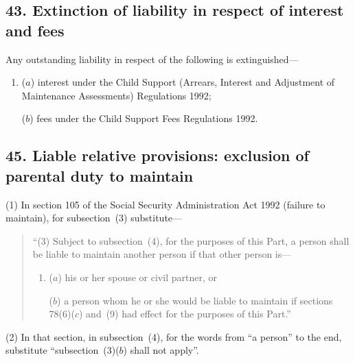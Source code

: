 \documentclass[12pt,a4paper]{article}
\begin{document}
\subsection{43. Extinction of liability in respect of interest and fees}

Any outstanding liability in respect of the following is extinguished—
\begin{enumerate}\item[]
($a$) interest under the Child Support (Arrears, Interest and Adjustment of Maintenance Assessments) Regulations 1992;

($b$) fees under the Child Support Fees Regulations 1992.
\end{enumerate}

%


\subsection{45. Liable relative provisions: exclusion of parental duty to maintain}

(1) In section 105 of the Social Security Administration Act 1992 (failure to maintain), for subsection~(3) substitute—
\begin{quotation}
“(3) Subject to subsection~(4), for the purposes of this Part, a person shall be liable to maintain another person if that other person is—
\begin{enumerate}\item[]
($a$) his or her spouse or civil partner, or

($b$) a person whom he or she would be liable to maintain if sections 78(6)($c$) and~(9) had effect for the purposes of this Part.”
\end{enumerate}
\end{quotation}

(2) In that section, in subsection~(4), for the words from “a person” to the end, substitute “subsection~(3)($b$) shall not apply”.

\end{document}
